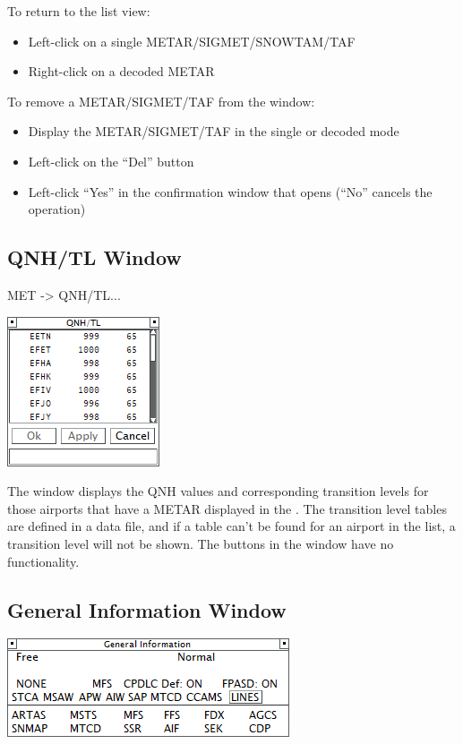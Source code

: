 \documentclass[11pt,a4paper]{memoir}
\begin{document}
To return to the list view:

\begin{itemize}
    \item Left-click on a single METAR/SIGMET/SNOWTAM/TAF
    \item Right-click on a decoded METAR
\end{itemize}

To remove a METAR/SIGMET/TAF from the window:

\begin{itemize}
    \item Display the METAR/SIGMET/TAF in the single or decoded mode
    \item Left-click on the “Del” button
    \item Left-click “Yes” in the confirmation window that opens (“No” cancels the operation)
\end{itemize}

\subsection{QNH/TL Window}
\label{win:qnhtl}

\textit{} MET -> QNH/TL...

\includegraphics{img/qnhtl.png}

The window displays the QNH values and corresponding transition levels for those airports that have a METAR displayed in the \textit{}. The transition level tables are defined in a data file, and if a table can’t be found for an airport in the list, a transition level will not be shown. The buttons in the window have no functionality.

\subsection{General Information Window}
\label{win:geninfo}

\includegraphics{img/geninfo.png}
\end{document}
